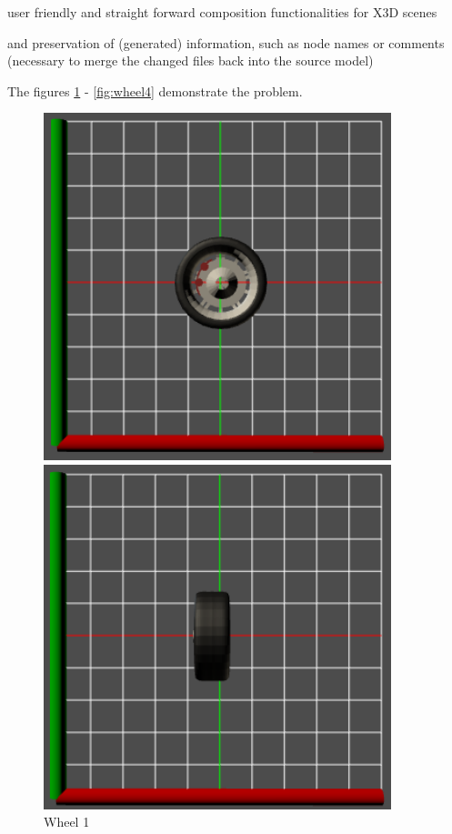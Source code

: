 \begin{itemize*}
\item user friendly and straight forward composition functionalities for \gls{X3D} scenes
\item and preservation of (generated) information, such as node names or comments (necessary to merge the changed files back into the source model)
\end{itemize*}

The figures \ref{fig:wheel1} - \ref{fig:wheel4} demonstrate the problem.

\begin{figure}[htbp]
  \begin{minipage}{.5\textwidth}
    \includegraphics[width=0.9\textwidth]{../assets/wheel1.png}
  	\caption{Wheel 1}
  	\label{fig:wheel1}
  \end{minipage}
  \begin{minipage}{.5\textwidth}
  	\includegraphics[width=0.9\textwidth]{../assets/wheel2.png}

\end{minipage}
\end{figure}
